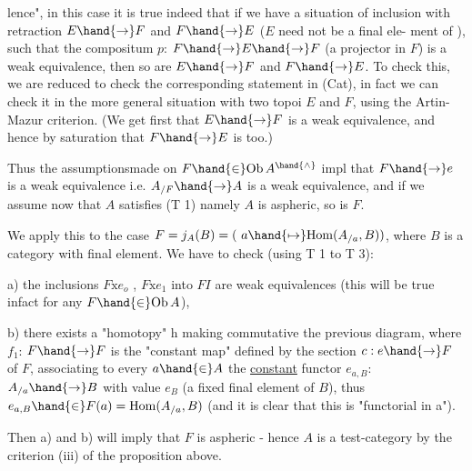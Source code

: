 
lence",  in this case it is true indeed that if we have a situation of
inclusion with retraction  $E\hand{\to} F$ and $F\hand{\to} E$  ($E$ need not be a final ele-%
ment of  ),  such that the compositum  $p$: $F\hand{\to} E\hand{\to} F$  (a projector in
$F$) is a weak equivalence,  then so are $E\hand{\to} F$ and $F\hand{\to} E$.  To check this,
we are reduced to check the corresponding statement in (Cat),  in fact we
can check it in the more general situation with two topoi $E$ and $F$,  using
the Artin-Mazur criterion.  (We get first that $E\hand{\to} F$ is a weak equivalence,
and hence by saturation that $F\hand{\to} E$ is too.)

Thus the assumptions\hand{/}made on $F\hand{\in} \mathrm{Ob}\,A^{\hand{\wedge}}$ impl that  $F\hand{\to} e$ is a weak
equivalence i.e.  $A_{/F}\hand{\to} A$ is a weak equivalence,  and if we assume now
that $A$ satisfies (T 1) namely $A$ is aspheric,  so is $F$.

We apply this to the case  $F = j_A(B) = (\ a\hand{\mapsto} \mathrm{Hom}(A_{/a},B))$,  where $B$
is a \inserted{[small]} category with final element.  We have to check (using T 1 to T 3):

a) the inclusions  $F\mathrm{x}e_o$ , $F\mathrm{x}e_1$ into $F$$I$ are weak equivalences (this will
be true in\hand{/}fact for any $F\hand{\in}\mathrm{Ob}\,A$\hand{$\hat{}$}),

b) there exists a "homotopy" h making commutative the previous diagram,
where  $f_1$:  $F\hand{\to} F$ is the "constant map" defined by the section
$c : e\hand{\to} F$ of $F$,  associating to every $a\hand{\in} A$ the \uline{constant} functor
$e_{a,B}$: $A_{/a}\hand{\to} B$  with value $e_B$ (a fixed final element of $B$),  thus
$e_{a,B}\hand{\in} F(a) = \mathrm{Hom}(A_{/a},B)$  (and it is clear that this is "functorial
in a").

Then  a) and b) will imply that $F$ is aspheric - hence $A$ is a test-category
by the criterion (iii) of the proposition above.


